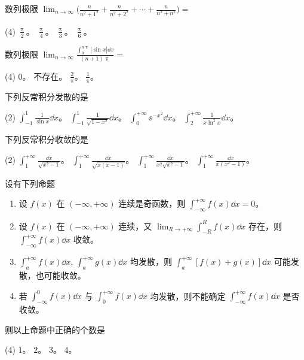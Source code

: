 \begin{ti}
	数列极限 $\lim_{n \to \infty} \biggl( \frac{n}{n^2+1^2} + \frac{n}{n^2+2^2} + \cdots + \frac{n}{n^2+n^2} \biggr) = $
	\begin{tasks}(4)
		\task $\frac{\uppi}{2}$。
		\task $\frac{\uppi}{4}$。
		\task $\frac{\uppi}{3}$。
		\task $\frac{\uppi}{6}$。
	\end{tasks}
\end{ti}

\begin{ti}
	数列极限 $\lim_{n \to \infty} \frac{\int_0^{n\uppi} |\sin x| \dd{x}}{(n+1)\uppi} = $
	\begin{tasks}(4)
		\task $0$。
		\task 不存在。
		\task $\frac{2}{\uppi}$。
		\task $\frac{1}{\uppi}$。
	\end{tasks}
\end{ti}

\begin{ti}
	下列反常积分发散的是
	\begin{tasks}(2)
		\task $\int_{-1}^1 \frac{1}{\sin x} \dd{x}$。
		\task $\int_{-1}^1 \frac{1}{\sqrt{1-x^2}} \dd{x}$。
		\task $\int_0^{+\infty} \ee^{-x^2} \dd{x}$。
		\task $\int_2^{+\infty} \frac{1}{x \ln^2x} \dd{x}$。
	\end{tasks}
\end{ti}

\begin{ti}
	下列反常积分收敛的是
	\begin{tasks}(2)
		\task $\int_1^{+\infty} \frac{\dd{x}}{\sqrt{x^2-1}}$。
		\task $\int_1^{+\infty} \frac{\dd{x}}{\sqrt{x(x-1)}}$。
		\task $\int_1^{+\infty} \frac{\dd{x}}{x^2 \sqrt{x^2-1}}$。
		\task $\int_1^{+\infty} \frac{\dd{x}}{x(x^2-1)}$。
	\end{tasks}
\end{ti}

\begin{ti}
	设有下列命题
	\begin{enumerate}
		\item 设 $f(x)$ 在 $(-\infty,+\infty)$ 连续是奇函数，则 $\int_{-\infty}^{+\infty} f(x) \dd{x} = 0$。
		\item 设 $f(x)$ 在 $(-\infty,+\infty)$ 连续，又 $\lim_{R \to +\infty}\int_{-R}^{R} f(x) \dd{x}$ 存在，则 $\int_{-\infty}^{+\infty} f(x) \dd{x}$ 收敛。
		\item $\int_{a}^{+\infty} f(x) \dd{x}$, $\int_{a}^{+\infty} g(x) \dd{x}$ 均发散，则 $\int_{a}^{+\infty} [f(x) + g(x)] \dd{x}$ 可能发散，也可能收敛。
		\item 若 $\int_{-\infty}^0 f(x) \dd{x}$ 与 $\int_0^{+\infty} f(x) \dd{x}$ 均发散，则不能确定 $\int_{-\infty}^{+\infty} f(x) \dd{x}$ 是否收敛。
	\end{enumerate}
	则以上命题中正确的个数是
	\begin{tasks}(4)
		\task $1$。
		\task $2$。
		\task $3$。
		\task $4$。
	\end{tasks}
\end{ti}

